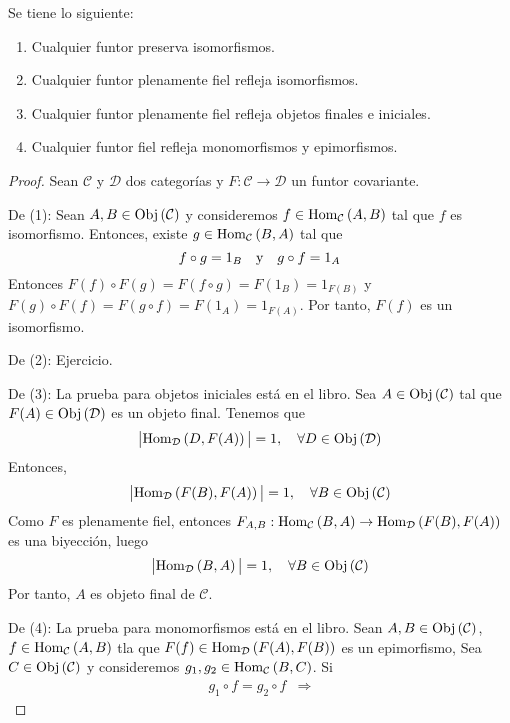 \documentclass[12pt]{report}
\newcounter{it}
\theoremstyle{largebreak}
\newcommand\abs[1]{\ensuremath{\big|#1\big|}}
\newcommand\cf[3]{\ensuremath{#1:#2\rightarrow#3}}
\newcommand{\Obj}[1]{\ensuremath{\textup{Obj}\left(#1\right)}}
\newcommand{\Hom}[3]{\ensuremath{\textup{Hom}_{#1}\left(#2,#3\right)}}
\begin{document}
    \begin{propo}
        Se tiene lo siguiente:
        \begin{enumerate}
            \item Cualquier funtor preserva isomorfismos.
            \item Cualquier funtor plenamente fiel refleja isomorfismos.
            \item Cualquier funtor plenamente fiel refleja objetos finales e iniciales.
            \item Cualquier funtor fiel refleja monomorfismos y epimorfismos.
        \end{enumerate}
    \end{propo}

    \begin{proof}
        Sean $\mathcal{C}$ y $\mathcal{D}$ dos categorías y $\cf{F}{\mathcal{C}}{\mathcal{D}}$ un funtor covariante.

        De (1): Sean $A,B\in\Obj{\mathcal{C}}$ y consideremos $f\in\Hom{\mathcal{C}}{A}{B}$ tal que $f$ es isomorfismo. Entonces, existe $g\in\Hom{\mathcal{C}}{B}{A}$ tal que
        \begin{equation*}
            f\circ g=1_B\quad\textup{y}\quad g\circ f=1_A
        \end{equation*}
        Entonces $F(f)\circ F(g)=F(f\circ g)=F(1_B)=1_{F(B)}$ y $F(g)\circ F(f)=F(g\circ f)=F(1_A)=1_{F(A)}$.
        Por tanto, $F(f)$ es un isomorfismo.

        De (2): Ejercicio.

        De (3): La prueba para objetos iniciales está en el libro. Sea $A\in\Obj{\mathcal{C}}$ tal que $F(A)\in\Obj{\mathcal{D}}$ es un objeto final. Tenemos que
        \begin{equation*}
            \abs{\Hom{\mathcal{D}}{D}{F(A)}}=1,\quad\forall D\in\Obj{\mathcal{D}}
        \end{equation*}
        Entonces,
        \begin{equation*}
            \abs{\Hom{\mathcal{D}}{F(B)}{F(A)}}=1,\quad\forall B\in\Obj{\mathcal{C}}
        \end{equation*}
        Como $F$ es plenamente fiel, entonces $\cf{F_{A,B}}{\Hom{\mathcal{C}}{B}{A}}{\Hom{\mathcal{D}}{F(B)}{F(A)}}$ es una biyección, luego
        \begin{equation*}
            \abs{\Hom{\mathcal{D}}{B}{A}}=1,\quad\forall B\in\Obj{\mathcal{C}}
        \end{equation*}
        Por tanto, $A$ es objeto final de $\mathcal{C}$.

        De (4): La prueba para monomorfismos está en el libro. Sean $A,B\in\Obj{\mathcal{C}}$, $f\in\Hom{\mathcal{C}}{A}{B}$ tla que $F(f)\in\Hom{\mathcal{D}}{F(A)}{F(B)}$ es un epimorfismo, Sea $C\in\Obj{\mathcal{C}}$ y consideremos $g_1,g_2\in\Hom{\mathcal{C}}{B}{C}$. Si
        \begin{equation*}
            \begin{split}
                g_1\circ f=g_2\circ f&\Rightarrow
            \end{split}
        \end{equation*}
    \end{proof}
\end{document}
